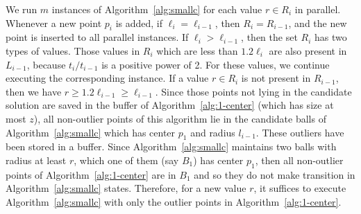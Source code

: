 \documentclass[envcountsame]{cls/cccg15}
\renewcommand{\O}{\ensuremath{{O}}}
\newcommand{\gee}{\geqslant}
\renewcommand{\ge}{\gee}
\newcommand{\eps}{\varepsilon}
\begin{document}
We run $m$ instances of Algorithm~\ref{alg:smallc} for each value $r \in R_i$ in parallel. 
Whenever a new point $p_i$ is added, 
if $\ell_i=\ell_{i-1}$, then $R_i = R_{i-1}$,
and the new point is inserted to all parallel instances. %
If $\ell_i > \ell_{i-1}$, then the set $R_i$ has two types of values.
Those values in $R_i$ which are less than $1.2\ell_i$ are also present in $L_{i-1}$,
because $t_i / t_{i-1}$ is a positive power of 2.
For these values, we continue executing the corresponding instance.
If a value $r \in R_i$ is not present in $R_{i-1}$, 
then we have $r \ge 1.2 \ell_{i - 1} \ge \ell_{i-1}$.
Since those points not lying in the candidate solution 
are saved in the buffer of Algorithm~\ref{alg:1-center} (which has size at most $z$), 
all non-outlier points of this algorithm lie in the candidate balls of Algorithm~\ref{alg:smallc} which has center $p_1$ and radius $l_{i-1}$. 
These outliers have been stored in a buffer. 
Since Algorithm~\ref{alg:smallc} maintains two balls with radius at least $r$, which one of them (say $B_1$) has center $p_1$, then all non-outlier points of Algorithm~\ref{alg:1-center} are in $B_1$ and so they do not make transition in Algorithm~\ref{alg:smallc} states.
Therefore, for a new value $r$, 
it suffices to execute Algorithm~\ref{alg:smallc} with only the outlier points in Algorithm~\ref{alg:1-center}.

\end{document}
